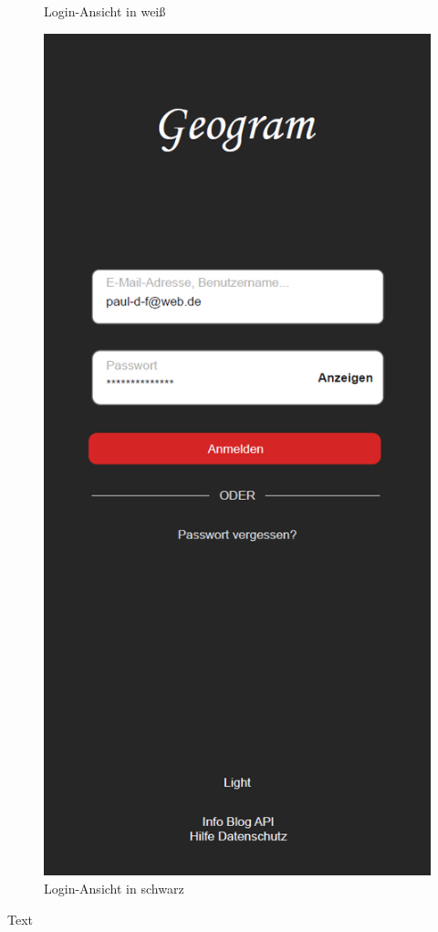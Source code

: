 \begin{figure}[H]
\begin{minipage}{.5\textwidth}
      \caption{Login-Ansicht in weiß}
      \label{fig:login_white}
    \end{minipage}%
    \begin{minipage}{.5\textwidth}
      \centering
      \includegraphics[width=.8\linewidth]{images/Login_MockUp_Black.png}
      \caption{Login-Ansicht in schwarz}
      \label{fig:login_black}
    \end{minipage}
\end{figure}

Text

